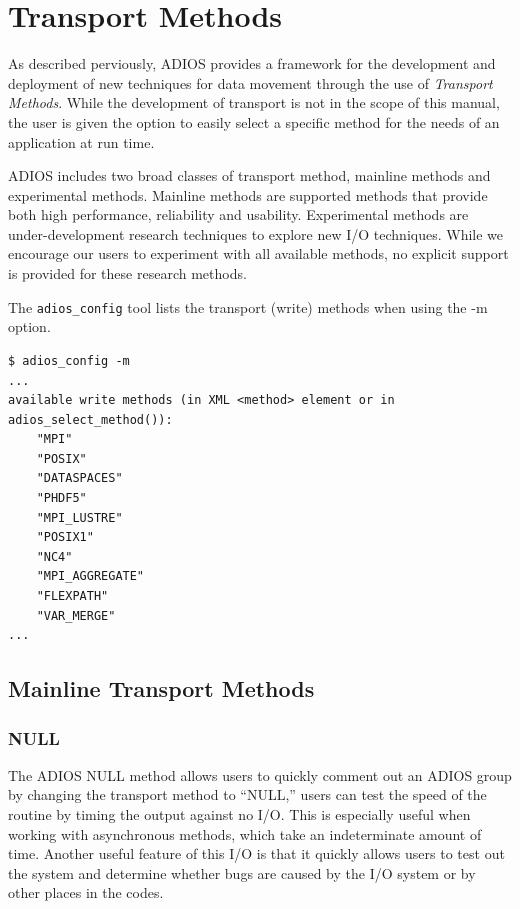 \chapter{Transport Methods}
\label{chapter-methods}

As described perviously, ADIOS provides a framework for the development and
deployment of new techniques for data movement through the use of {\em
  Transport Methods}. While the development of transport is not in the scope of
this manual, the user is given the option to easily select a specific method for
the needs of an application at run time. 

ADIOS includes two broad classes of transport method, mainline methods and
experimental methods. Mainline methods are supported methods that provide both
high performance, reliability and usability. Experimental methods are
under-development research techniques to explore new I/O techniques. While we
encourage our users to experiment with all available methods, no explicit
support is provided for these research methods. 

The \verb+adios_config+ tool lists the transport (write) methods when using the -m option.

\begin{lstlisting}
$ adios_config -m
...
available write methods (in XML <method> element or in adios_select_method()):
    "MPI"
    "POSIX"
    "DATASPACES"
    "PHDF5"
    "MPI_LUSTRE"
    "POSIX1"
    "NC4"
    "MPI_AGGREGATE"
    "FLEXPATH"
    "VAR_MERGE"
...
\end{lstlisting}



\section{Mainline Transport Methods}

\subsection{NULL}

The ADIOS NULL method allows users to quickly comment out an ADIOS group by changing 
the transport method to ``NULL,'' users can test the speed of the routine by timing 
the output against no I/O. This is especially useful when working with asynchronous 
methods, which take an indeterminate amount of time.  Another useful feature of 
this I/O is that it quickly allows users to test out the system and determine whether 
bugs are caused by the I/O system or by other places in the codes.


